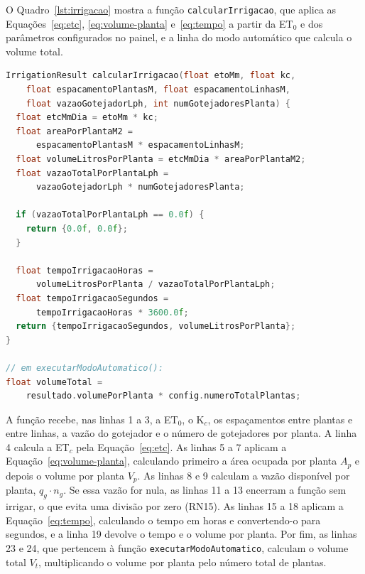O Quadro~\ref{lst:irrigacao} mostra a função \texttt{calcularIrrigacao}, que aplica as Equações~\ref{eq:etc}, \ref{eq:volume-planta} e~\ref{eq:tempo} a partir da ET$_0$ e dos parâmetros configurados no painel, e a linha do modo automático que calcula o volume total.

\vspace{0.6\baselineskip}
\noindent\begin{minipage}{\linewidth}
\begin{lstlisting}[language=C++, caption={Cálculo do volume e do tempo de irrigação no firmware (função calcularIrrigacao)}, label={lst:irrigacao}]
IrrigationResult calcularIrrigacao(float etoMm, float kc,
    float espacamentoPlantasM, float espacamentoLinhasM,
    float vazaoGotejadorLph, int numGotejadoresPlanta) {
  float etcMmDia = etoMm * kc;
  float areaPorPlantaM2 =
      espacamentoPlantasM * espacamentoLinhasM;
  float volumeLitrosPorPlanta = etcMmDia * areaPorPlantaM2;
  float vazaoTotalPorPlantaLph =
      vazaoGotejadorLph * numGotejadoresPlanta;

  if (vazaoTotalPorPlantaLph == 0.0f) {
    return {0.0f, 0.0f};
  }

  float tempoIrrigacaoHoras =
      volumeLitrosPorPlanta / vazaoTotalPorPlantaLph;
  float tempoIrrigacaoSegundos =
      tempoIrrigacaoHoras * 3600.0f;
  return {tempoIrrigacaoSegundos, volumeLitrosPorPlanta};
}

// em executarModoAutomatico():
float volumeTotal =
    resultado.volumePorPlanta * config.numeroTotalPlantas;
\end{lstlisting}
\vspace{-0.5\baselineskip}
\end{minipage}
\medskip

A função recebe, nas linhas 1 a 3, a ET$_0$, o K$_c$, os espaçamentos entre plantas e entre linhas, a vazão do gotejador e o número de gotejadores por planta. A linha 4 calcula a ET$_c$ pela Equação~\ref{eq:etc}. As linhas 5 a 7 aplicam a Equação~\ref{eq:volume-planta}, calculando primeiro a área ocupada por planta $A_p$ e depois o volume por planta $V_p$. As linhas 8 e 9 calculam a vazão disponível por planta, $q_g \cdot n_g$. Se essa vazão for nula, as linhas 11 a 13 encerram a função sem irrigar, o que evita uma divisão por zero (RN15). As linhas 15 a 18 aplicam a Equação~\ref{eq:tempo}, calculando o tempo em horas e convertendo-o para segundos, e a linha 19 devolve o tempo e o volume por planta. Por fim, as linhas 23 e 24, que pertencem à função \texttt{executarModoAutomatico}, calculam o volume total $V_t$, multiplicando o volume por planta pelo número total de plantas.


